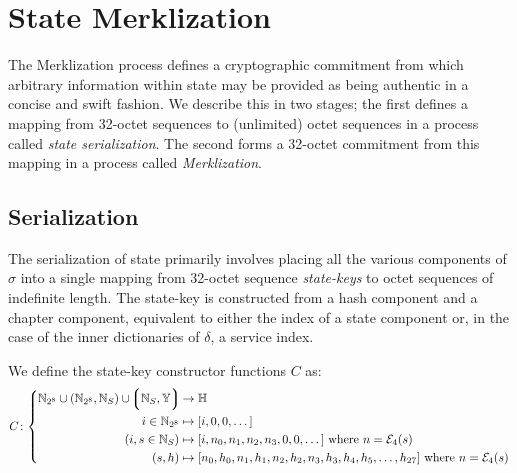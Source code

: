 \section{State Merklization}\label{sec:statemerklization}

The Merklization process defines a cryptographic commitment from which arbitrary information within state may be provided as being authentic in a concise and swift fashion. We describe this in two stages; the first defines a mapping from 32-octet sequences to (unlimited) octet sequences in a process called \emph{state serialization}. The second forms a 32-octet commitment from this mapping in a process called \emph{Merklization}.

\subsection{Serialization}

The serialization of state primarily involves placing all the various components of $\sigma$ into a single mapping from 32-octet sequence \emph{state-keys} to octet sequences of indefinite length. The state-key is constructed from a hash component and a chapter component, equivalent to either the index of a state component or, in the case of the inner dictionaries of $\delta$, a service index.

We define the state-key constructor functions $C$ as:
\begin{equation}
  C\colon\left\{\begin{aligned}
    \N_{2^8} \cup (\N_{2^8}, \N_S) \cup \tup{\N_S, \Y} &\to \H \\
    i \in \N_{2^8} &\mapsto [i, 0, 0, \dots] \\
    (i, s \in \N_S) &\mapsto [i, n_0, n_1, n_2, n_3, 0, 0, \dots]\ \where n = \se_4(s) \\
    (s, h) &\mapsto [n_0, h_0, n_1, h_1, n_2, h_2, n_3, h_3, h_4, h_5, \dots, h_{27}]\ \where n = \se_4(s)
  \end{aligned}
  \right.
\end{equation}

